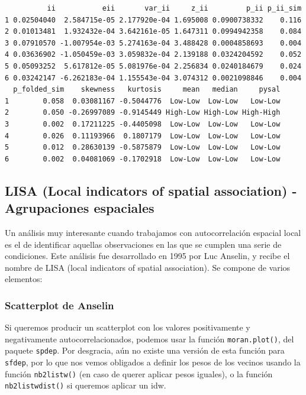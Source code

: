 \documentclass[
  letterpaper,
  DIV=11,
  numbers=noendperiod]{scrreprt}
\begin{document}
\begin{verbatim}
          ii           eii       var_ii     z_ii         p_ii p_ii_sim
1 0.02504040  2.584715e-05 2.177920e-04 1.695008 0.0900738332    0.116
2 0.01013481  1.932432e-04 3.642161e-05 1.647311 0.0994942358    0.084
3 0.07910570 -1.007954e-03 5.274163e-04 3.488428 0.0004858693    0.004
4 0.03636902 -1.050459e-03 3.059832e-04 2.139188 0.0324204592    0.052
5 0.05093252  5.617812e-05 5.081976e-04 2.256834 0.0240184679    0.024
6 0.03242147 -6.262183e-04 1.155543e-04 3.074312 0.0021098846    0.004
  p_folded_sim    skewness   kurtosis     mean   median     pysal
1        0.058  0.03081167 -0.5044776  Low-Low  Low-Low   Low-Low
2        0.050 -0.26997089 -0.9145449 High-Low High-Low High-High
3        0.002  0.17211225 -0.4405098  Low-Low  Low-Low   Low-Low
4        0.026  0.11193966  0.1807179  Low-Low  Low-Low   Low-Low
5        0.012  0.28630139 -0.5875879  Low-Low  Low-Low   Low-Low
6        0.002  0.04081069 -0.1702918  Low-Low  Low-Low   Low-Low
\end{verbatim}

\hypertarget{lisa-local-indicators-of-spatial-association---agrupaciones-espaciales}{%
\subsection{LISA (Local indicators of spatial association) -
Agrupaciones
espaciales}\label{lisa-local-indicators-of-spatial-association---agrupaciones-espaciales}}

Un análisis muy interesante cuando trabajamos con autocorrelación
espacial local es el de identificar aquellas observaciones en las que se
cumplen una serie de condiciones. Este análisis fue desarrollado en 1995
por Luc Anselin, y recibe el nombre de LISA (local indicators of spatial
association). Se compone de varios elementos:

\hypertarget{scatterplot-de-anselin}{%
\subsubsection{Scatterplot de Anselin}\label{scatterplot-de-anselin}}

Si queremos producir un scatterplot con los valores positivamente y
negativamente autocorrelacionados, podemos usar la función
\texttt{moran.plot()}, del paquete \texttt{spdep}. Por desgracia, aún no
existe una versión de esta función para \texttt{sfdep}, por lo que nos
vemos obligados a definir los pesos de los vecinos usando la función
\texttt{nb2listw()} (en caso de querer aplicar pesos iguales), o la
función \texttt{nb2listwdist()} si queremos aplicar un idw.
\end{document}
